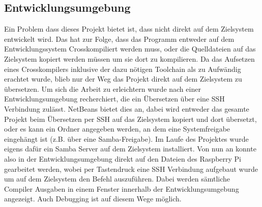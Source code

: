 \subsection{Entwicklungsumgebung}
Ein Problem dass dieses Projekt bietet ist, dass nicht direkt auf dem Zielsystem entwickelt wird. Das hat zur Folge, dass das Programm entweder auf dem Entwicklungssystem Crosskompiliert werden muss, oder die Quelldateien auf das Zielsystem kopiert werden müssen um sie dort zu kompilieren. Da das Aufsetzen eines Crosskompilers inklusive der dazu nötigen Toolchain als zu Aufwändig erachtet wurde, blieb nur der Weg das Projekt direkt auf dem Zielsystem zu übersetzen. Um sich die Arbeit zu erleichtern wurde nach einer Entwicklungsumgebung recherchiert, die ein Übersetzen über eine SSH Verbindung zulässt. NetBeans \cite{URL:NetBeans} bietet dies an, dabei wird entweder das gesamte Projekt beim Übersetzen per SSH auf das Zielsystem kopiert und dort übersetzt, oder es kann ein Ordner angegeben werden, an dem eine Systemfreigabe eingehängt ist (z.B. über eine Samba-Freigabe). Im Laufe des Projektes wurde eigens dafür ein Samba Server auf dem Zielsystem installiert. Von nun an konnte also in der Entwicklungsumgebung direkt auf den Dateien des Raspberry Pi gearbeitet werden, wobei per Tastendruck eine SSH Verbindung aufgebaut wurde um auf dem Zielsystem den Befehl  auszuführen. Dabei werden sämtliche Compiler Ausgaben in einem Fenster innerhalb der Entwicklungsumgebung angezeigt. Auch Debugging ist auf diesem Wege möglich.

